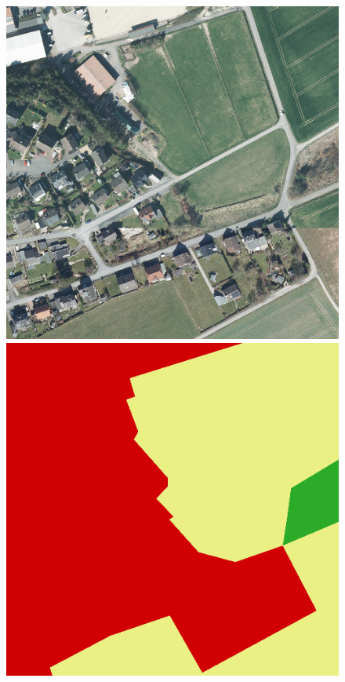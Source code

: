 {\begin{figure}
    \includegraphics[width=\DiscussionImageWidth]{images/segmentation_discussion/images/716.png} \hfill
    \includegraphics[width=\DiscussionImageWidth]{images/segmentation_discussion/labels/716.png} \hfill

\end{figure}}
